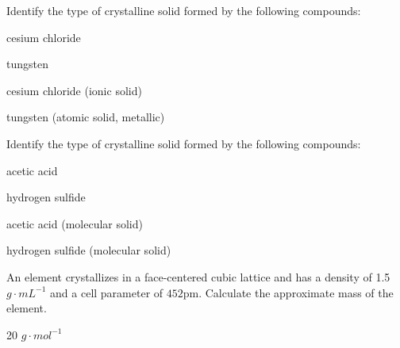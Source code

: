 \documentclass[main.tex]{subfiles}
\begin{document}
\begin{multicols*}{2}
\begin{question}[ID=\the\value{numA}]
Identify the type of crystalline solid formed by the following compounds:
\begin{inparaenum}[(a)]
\item    cesium chloride %
\item      tungsten %
\end{inparaenum}
\end{question}
\begin{solution}
\begin{inparaenum}[(a)]
\item    cesium chloride  (ionic solid)
\item      tungsten  (atomic solid, metallic)
\end{inparaenum}\hspace{0.1cm}\end{solution}
\begin{question}[ID=\the\value{numA}]
Identify the type of crystalline solid formed by the following compounds:
\begin{inparaenum}[(a)]
\item acetic acid %
\item hydrogen sulfide %
\end{inparaenum}
\end{question}
\begin{solution}
\begin{inparaenum}[(a)]
\item acetic acid  (molecular solid)
\item hydrogen sulfide (molecular solid)
\end{inparaenum}\hspace{0.1cm}\end{solution}
\begin{question}[ID=\the\value{numA}]
An element crystallizes in a face-centered cubic lattice and has a density of 1.5 $g\cdot mL^{-1}$ and a cell parameter of $452$pm. Calculate the approximate mass of the element.
\end{question}
\begin{solution}
 20 $g\cdot mol^{-1}$
 \hspace{0.1cm}\end{solution}

\end{multicols*}
\end{document}
